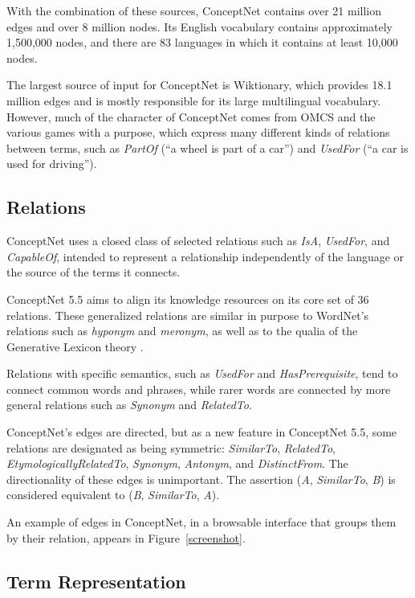 \documentclass[letterpaper]{article}
\begin{document}
With the combination of these sources, ConceptNet contains over 21
million edges and over 8 million nodes. Its English vocabulary contains
approximately 1,500,000 nodes, and there are 83 languages in which it
contains at least 10,000 nodes.

The largest source of input for ConceptNet is Wiktionary, which provides
18.1 million edges and is mostly responsible for its large multilingual
vocabulary. However, much of the character of ConceptNet comes from OMCS
and the various games with a purpose, which express many different kinds
of relations between terms, such as \emph{PartOf} (``a wheel is part of
a car'') and \emph{UsedFor} (``a car is used for driving'').


\subsection{Relations}\label{relations}

ConceptNet uses a closed class of selected relations such as \emph{IsA},
\emph{UsedFor}, and \emph{CapableOf}, intended to
represent a relationship independently of the language or the source of
the terms it connects.

ConceptNet 5.5 aims to align its knowledge resources on its core set of 36
relations. These generalized relations are similar in purpose to WordNet's
relations such as \emph{hyponym} and \emph{meronym}, as well as to the qualia
of the Generative Lexicon theory \cite{pustejovsky1991generative}.

Relations with specific semantics, such as \emph{UsedFor} and
\emph{HasPrerequisite}, tend to connect common words and phrases, while
rarer words are connected by more general relations such as
\emph{Synonym} and \emph{RelatedTo}.

ConceptNet's edges are directed, but as a new feature in ConceptNet 5.5,
some relations are designated as being symmetric: \emph{SimilarTo},
\emph{RelatedTo}, \emph{EtymologicallyRelatedTo}, \emph{Synonym},
\emph{Antonym}, and \emph{DistinctFrom}. The directionality of these
edges is unimportant. The assertion (\emph{A}, \emph{SimilarTo},
\emph{B}) is considered equivalent to (\emph{B}, \emph{SimilarTo},
\emph{A}).

An example of edges in ConceptNet, in a browsable interface that groups
them by their relation, appears in Figure~\ref{screenshot}.

\subsection{Term Representation}\label{term-representation}
\end{document}
